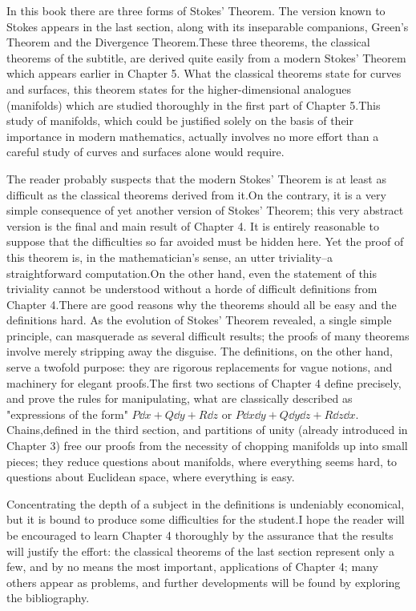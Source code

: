 In this book there are three forms of Stokes' Theorem.
The version known to Stokes appears in the last section, along
with its inseparable companions, Green's Theorem and the
Divergence Theorem.These three theorems, the classical
theorems of the subtitle, are derived quite easily from a
modern Stokes' Theorem which appears earlier in Chapter 5.
What the classical theorems state for curves and surfaces, this
theorem states for the higher-dimensional analogues (manifolds) 
which are studied thoroughly in the first part of Chapter
5.This study of manifolds, which could be justified solely on
the basis of their importance in modern mathematics, actually
involves no more effort than a careful study of curves and 
surfaces alone would require.

The reader probably suspects that the modern Stokes'
Theorem is at least as difficult as the classical theorems
derived from it.On the contrary, it is a very simple consequence of 
yet another version of Stokes' Theorem; this very
abstract version is the final and main result of Chapter 4.
It is entirely reasonable to suppose that the difficulties so far
avoided must be hidden here. Yet the proof of this theorem is, 
in the mathematician's sense, an utter triviality--a 
straightforward computation.On the other hand, even the statement
of this triviality cannot be understood without a horde of
difficult definitions from Chapter 4.There are good reasons
why the theorems should all be easy and the definitions hard.
As the evolution of Stokes' Theorem revealed, a single simple
principle, can masquerade as several difficult results; the proofs
of many theorems involve merely stripping away the disguise.
The definitions, on the other hand, serve a twofold purpose:
they are rigorous replacements for vague notions, and
machinery for elegant proofs.The first two sections of
Chapter 4 define precisely, and prove the rules for manipulating, 
what are classically described as "expressions of the form"
$P \dd x + Q\dd y + R\dd z$ or $P \dd x\dd y + Q\dd y\dd z + R\dd z\dd x$.
Chains,defined in the third section, and partitions of unity (already
introduced in Chapter 3) free our proofs from the necessity of
chopping manifolds up into small pieces; they reduce questions
about manifolds, where everything seems hard, to questions
about Euclidean space, where everything is easy.

Concentrating the depth of a subject in the definitions is
undeniably economical, but it is bound to produce some
difficulties for the student.I hope the reader will be encouraged to 
learn Chapter 4 thoroughly by the assurance that the
results will justify the effort: the classical theorems of the last
section represent only a few, and by no means the most 
important, applications of Chapter 4; many others appear as
problems, and further developments will be found by exploring
the bibliography.

